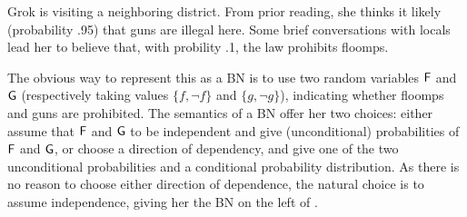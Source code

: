 \begin{example} \label{ex:guns-and-floomps}
Grok is visiting a neighboring district. From prior reading, she thinks it
likely (probability .95) that guns are illegal here. Some brief conversations
with locals lead her to believe that, with probility .1, the law
prohibits floomps.

The obvious way to represent this as a BN is to use two random variables
$\mathsf{F}$ and $\mathsf{G}$ (respectively taking values $\{f, \lnot f\}$ and
$\{ g, \lnot g\}$),
indicating whether  floomps and guns are prohibited.
The semantics of a BN offer her two choices: either assume that $\mathsf{F}$ and $\mathsf{G}$
to be independent and give (unconditional) probabilities of $\mathsf{F}$ and $\mathsf{G}$, or
choose a direction of dependency, and give one of the two unconditional
probabilities and a conditional probability distribution. 
As there is no reason to choose either direction of dependence, the
natural choice is to 
assume independence, giving her the 
BN on the left of .

\begin{figure}[htb]
  \centering
\ifprecompiledfigs
~\vrule~
\else
\end{figure}
\end{example}
